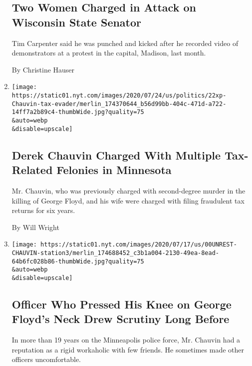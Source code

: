 \begin{enumerate}
  \hypertarget{two-women-charged-in-attack-on-wisconsin-state-senator}{%
  \subsection{Two Women Charged in Attack on Wisconsin State
  Senator}\label{two-women-charged-in-attack-on-wisconsin-state-senator}}

  Tim Carpenter said he was punched and kicked after he recorded video
  of demonstrators at a protest in the capital, Madison, last month.

  By Christine Hauser
\item
  \href{/2020/07/22/us/derek-chauvin-tax-fraud.html}{}

  \texttt{[image: https://static01.nyt.com/images/2020/07/24/us/politics/22xp-Chauvin-tax-evader/merlin\_174370644\_b56d99bb-404c-471d-a722-14ff7a2b89c4-thumbWide.jpg?quality=75\\\&auto=webp\\\&disable=upscale]}

  \hypertarget{derek-chauvin-charged-with-multiple-tax-related-felonies-in-minnesota}{%
  \subsection{Derek Chauvin Charged With Multiple Tax-Related Felonies
  in
  Minnesota}\label{derek-chauvin-charged-with-multiple-tax-related-felonies-in-minnesota}}

  Mr. Chauvin, who was previously charged with second-degree murder in
  the killing of George Floyd, and his wife were charged with filing
  fraudulent tax returns for six years.

  By Will Wright
\item
  \href{/2020/07/18/us/derek-chauvin-george-floyd.html}{}

  \texttt{[image: https://static01.nyt.com/images/2020/07/17/us/00UNREST-CHAUVIN-station3/merlin\_174688452\_c3b1a004-2130-49ea-8ead-64b6fc028b86-thumbWide.jpg?quality=75\\\&auto=webp\\\&disable=upscale]}

  \hypertarget{officer-who-pressed-his-knee-on-george-floyds-neck-drew-scrutiny-long-before}{%
  \subsection{Officer Who Pressed His Knee on George Floyd's Neck Drew
  Scrutiny Long
  Before}\label{officer-who-pressed-his-knee-on-george-floyds-neck-drew-scrutiny-long-before}}

  In more than 19 years on the Minneapolis police force, Mr. Chauvin had
  a reputation as a rigid workaholic with few friends. He sometimes made
  other officers uncomfortable.


\end{enumerate}
